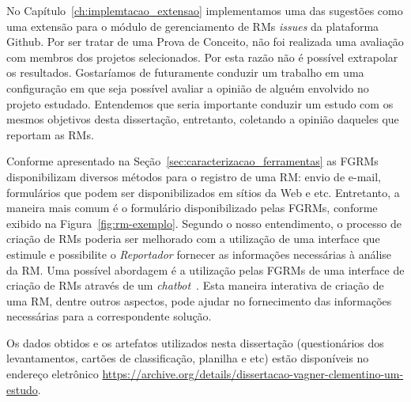 No Capítulo~\ref{ch:implemtacao_extensao} implementamos uma das sugestões como
uma extensão para o módulo de gerenciamento de RMs \textit{issues} da
plataforma Github. Por ser tratar de uma Prova de Conceito, não foi realizada
uma avaliação com membros dos projetos selecionados. Por esta razão não é
possível extrapolar os resultados.  Gostaríamos de futuramente conduzir um
trabalho em uma configuração em que seja possível avaliar a opinião de alguém
envolvido no projeto estudado. Entendemos que seria importante conduzir um
estudo com os mesmos objetivos desta dissertação, entretanto, coletando a
opinião daqueles que reportam as RMs.

Conforme apresentado na Seção~\ref{sec:caracterizacao_ferramentas} as FGRMs
disponibilizam diversos métodos para o registro de uma RM\@: envio de e-mail,
formulários que podem ser disponibilizados em sítios da Web e etc. Entretanto,
a maneira mais comum é o formulário disponibilizado pelas FGRMs, conforme
exibido na Figura~\ref{fig:rm-exemplo}. Segundo o nosso entendimento, o
processo de criação de RMs poderia ser melhorado com a utilização de uma
interface que estimule e possibilite o \textit{Reportador} fornecer as
informações necessárias à análise da RM\@. Uma possível abordagem é a
utilização pelas FGRMs de uma interface de criação de RMs através de um
\textit{chatbot}~\cite{mauldin1994chatterbots,huang2007extracting}. Esta
maneira interativa de criação de uma RM, dentre outros aspectos, pode ajudar no
fornecimento das informações necessárias para a correspondente solução.

Os dados obtidos e os artefatos utilizados nesta dissertação (questionários dos
levantamentos, cartões de classificação, planilha e etc) estão disponíveis no
endereço eletrônico
\url{https://archive.org/details/dissertacao-vagner-clementino-um-estudo}.

